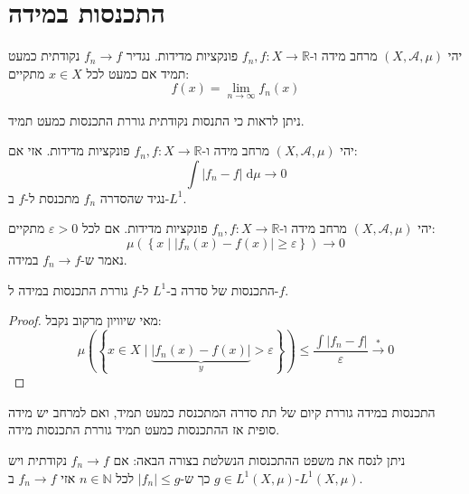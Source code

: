 \documentclass{tstextbook}
\begin{document}
\section{התכנסות במידה}

\begin{definition}
יהי \(\left( X,\mathcal{A},\mu \right)\) מרחב מידה ו-\(f_{n},f:X\to \mathbb{R}\) פונקציות מדידות. נגדיר \(f_{n}\to f\) נקודתית כמעט תמיד אם כמעט לכל \(x \in X\) מתקיים:
$$f(x)=\lim_{ n \to \infty } f_{n}(x)$$

\end{definition}
\begin{remark}
ניתן לראות כי התנסות נקודתית גוררת התכנסות כמעט תמיד.

\end{remark}
\begin{definition}[התכנסות ב-\(L^{1}\)]
יהי \(\left( X,\mathcal{A},\mu \right)\) מרחב מידה ו-\(f_{n},f :X\to \mathbb{R}\) פונקציות מדידות. אזי אם:
$$\int \lvert f_{n}-f \rvert  \;\mathrm{d} \mu\to 0 $$
נגיד שהסדרה \(f_{n}\) מתכנסת ל-\(f\) ב-\(L^{1}\).

\end{definition}
\begin{definition}
יהי \(\left( X,\mathcal{A},\mu \right)\) מרחב מידה ו-\(f_{n},f:X\to \mathbb{R}\) פונקציות מדידות. אם לכל \(\varepsilon> 0\) מתקיים:
$$\mu\left( \left\{  x\mid \lvert f_{n}(x)-f(x) \rvert \geq \varepsilon  \right\} \right)\to 0$$
נאמר ש-\(f_{n}\to f\) במידה.

\end{definition}
\begin{corollary}
התכנסות של סדרה ב-\(L^{1}\) ל-\(f\) גוררת התכנסות במידה ל-\(f\).

\end{corollary}
\begin{proof}
מאי שיוויון מרקוב נקבל:
$$\mu\left(\left\{x\in X\mid\underbrace{\left|f_{n}\left(x\right)-f\left(x\right)\right|}_{y}>\varepsilon\right\}\right)\leq\frac{\int\left|f_{n}-f\right|}{\varepsilon}\stackrel{*}{\to}0$$

\end{proof}
\begin{proposition}
התכנסות במידה גוררת קיום של תת סדרה המתכנסת כמעט תמיד, ואם למרחב יש מידה סופית אז ההתכנסות כמעט תמיד גוררת התכנסות מידה.

\end{proposition}
\begin{remark}
ניתן לנסח את משפט ההתכנסות הנשלטת בצורה הבאה:
אם \(f_{n}\to f\) נקודתית ויש \(g \in L^{1}\left( X,\mu \right)\) כך ש-\(\lvert f_{n} \rvert\leq g\) לכל \(n \in \mathbb{N}\) אזי \(f_{n}\to f\) ב-\(L^{1}\left( X,\mu \right)\).

\end{remark}
\end{document}
